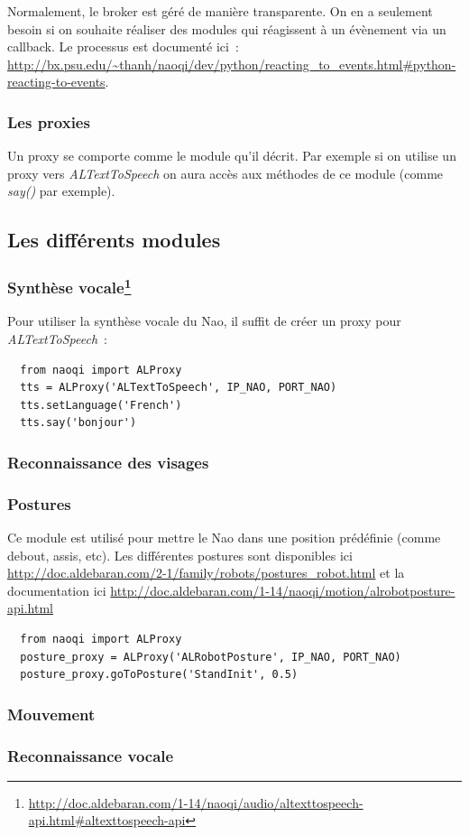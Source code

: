 \documentclass{article}
\begin{document}
Normalement, le broker est géré de manière transparente. On en a seulement besoin si on souhaite réaliser des modules qui réagissent à un évènement via un callback. Le processus est documenté ici~: \url{http://bx.psu.edu/~thanh/naoqi/dev/python/reacting_to_events.html#python-reacting-to-events}.

\subsubsection{Les proxies}

Un proxy se comporte comme le module qu'il décrit. Par exemple si on utilise un proxy vers \emph{ALTextToSpeech} on aura accès aux méthodes de ce module (comme \emph{say()} par exemple).

\subsection{Les différents modules}

\subsubsection{Synthèse vocale\footnote{\url{http://doc.aldebaran.com/1-14/naoqi/audio/altexttospeech-api.html#altexttospeech-api}}}

Pour utiliser la synthèse vocale du Nao, il suffit de créer un proxy pour \emph{ALTextToSpeech}~:
\begin{verbatim}
  from naoqi import ALProxy
  tts = ALProxy('ALTextToSpeech', IP_NAO, PORT_NAO)
  tts.setLanguage('French')
  tts.say('bonjour')
\end{verbatim}

\subsubsection{Reconnaissance des visages}
\subsubsection{Postures}

Ce module est utilisé pour mettre le Nao dans une position prédéfinie (comme debout, assis, etc). Les différentes postures sont disponibles ici \url{http://doc.aldebaran.com/2-1/family/robots/postures_robot.html} et la documentation ici \url{http://doc.aldebaran.com/1-14/naoqi/motion/alrobotposture-api.html}

\begin{verbatim}
  from naoqi import ALProxy
  posture_proxy = ALProxy('ALRobotPosture', IP_NAO, PORT_NAO)
  posture_proxy.goToPosture('StandInit', 0.5)
\end{verbatim}

\subsubsection{Mouvement}
\subsubsection{Reconnaissance vocale}
\end{document}
